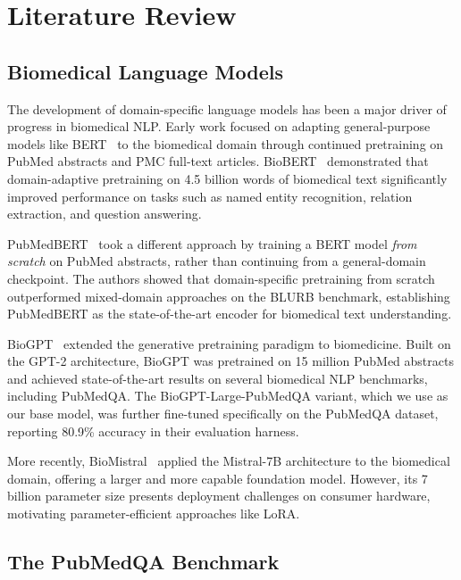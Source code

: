 \documentclass[conference]{IEEEtran}
\begin{document}
\section{Literature Review}

\subsection{Biomedical Language Models}

The development of domain-specific language models has been a major driver of progress in biomedical NLP. Early work focused on adapting general-purpose models like BERT~\cite{devlin2019bert} to the biomedical domain through continued pretraining on PubMed abstracts and PMC full-text articles. BioBERT~\cite{lee2020biobert} demonstrated that domain-adaptive pretraining on 4.5 billion words of biomedical text significantly improved performance on tasks such as named entity recognition, relation extraction, and question answering.

PubMedBERT~\cite{gu2021domain} took a different approach by training a BERT model \textit{from scratch} on PubMed abstracts, rather than continuing from a general-domain checkpoint. The authors showed that domain-specific pretraining from scratch outperformed mixed-domain approaches on the BLURB benchmark, establishing PubMedBERT as the state-of-the-art encoder for biomedical text understanding.

BioGPT~\cite{luo2022biogpt} extended the generative pretraining paradigm to biomedicine. Built on the GPT-2 architecture, BioGPT was pretrained on 15 million PubMed abstracts and achieved state-of-the-art results on several biomedical NLP benchmarks, including PubMedQA. The BioGPT-Large-PubMedQA variant, which we use as our base model, was further fine-tuned specifically on the PubMedQA dataset, reporting 80.9\% accuracy in their evaluation harness.

More recently, BioMistral~\cite{labrak2024biomistral} applied the Mistral-7B architecture to the biomedical domain, offering a larger and more capable foundation model. However, its 7 billion parameter size presents deployment challenges on consumer hardware, motivating parameter-efficient approaches like LoRA.

\subsection{The PubMedQA Benchmark}
\end{document}
